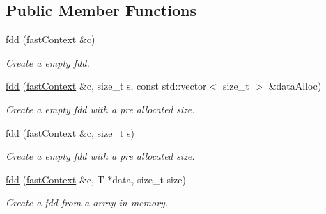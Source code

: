 \subsection*{Public Member Functions}
\begin{DoxyCompactItemize}
\item 
\hypertarget{classfaster_1_1fdd_a1f61fd1cb290f8d2f7570eb9f260866f}{}\label{classfaster_1_1fdd_a1f61fd1cb290f8d2f7570eb9f260866f} 
\hyperlink{classfaster_1_1fdd_a1f61fd1cb290f8d2f7570eb9f260866f}{fdd} (\hyperlink{classfaster_1_1fastContext}{fast\+Context} \&c)
\begin{DoxyCompactList}\small\item\em Create a empty fdd. \end{DoxyCompactList}\item 
\hypertarget{classfaster_1_1fdd_a0ab5257609851930bd86b4de3094e8b4}{}\label{classfaster_1_1fdd_a0ab5257609851930bd86b4de3094e8b4} 
\hyperlink{classfaster_1_1fdd_a0ab5257609851930bd86b4de3094e8b4}{fdd} (\hyperlink{classfaster_1_1fastContext}{fast\+Context} \&c, size\+\_\+t s, const std\+::vector$<$ size\+\_\+t $>$ \&data\+Alloc)
\begin{DoxyCompactList}\small\item\em Create a empty fdd with a pre allocated size. \end{DoxyCompactList}\item 
\hypertarget{classfaster_1_1fdd_af37f3ee02b11f4e0c7b0cc9f0e241dee}{}\label{classfaster_1_1fdd_af37f3ee02b11f4e0c7b0cc9f0e241dee} 
\hyperlink{classfaster_1_1fdd_af37f3ee02b11f4e0c7b0cc9f0e241dee}{fdd} (\hyperlink{classfaster_1_1fastContext}{fast\+Context} \&c, size\+\_\+t s)
\begin{DoxyCompactList}\small\item\em Create a empty fdd with a pre allocated size. \end{DoxyCompactList}\item 
\hypertarget{classfaster_1_1fdd_aa5b44359537e276d46a8902758501839}{}\label{classfaster_1_1fdd_aa5b44359537e276d46a8902758501839} 
\hyperlink{classfaster_1_1fdd_aa5b44359537e276d46a8902758501839}{fdd} (\hyperlink{classfaster_1_1fastContext}{fast\+Context} \&c, T $\ast$data, size\+\_\+t size)
\begin{DoxyCompactList}\small\item\em Create a fdd from a array in memory. \end{DoxyCompactList}\item 
\hypertarget{classfaster_1_1fdd_a76eee3a3adcb360d9b63bb50c1214de3}{}\label{classfaster_1_1fdd_a76eee3a3adcb360d9b63bb50c1214de3} 

\end{DoxyCompactItemize}
